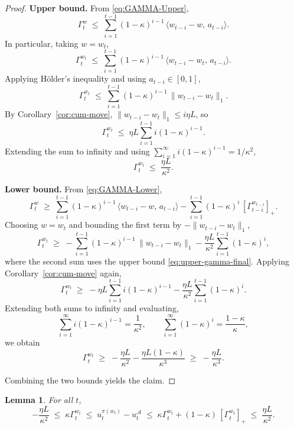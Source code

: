 \documentclass[11pt]{article}
\newtheorem{Thm:Lemma}{Lemma}
\begin{document}
\begin{proof}
\textbf{Upper bound.}  
From \eqref{eq:GAMMA-Upper},
\[
\Gamma_t^{w}
\;\leq\;
\sum_{i=1}^{t-1} (1-\kappa)^{i-1}\,\langle w_{t-i}-w,\,a_{t-i}\rangle .
\]
In particular, taking \(w=w_t\),
\[
\Gamma_t^{w_t}
\;\leq\;
\sum_{i=1}^{t-1} (1-\kappa)^{i-1}\,\langle w_{t-i}-w_t,\,a_{t-i}\rangle .
\]
Applying Hölder’s inequality and using \(a_{t-i}\in[0,1]\),
\[
\Gamma_t^{w_t}
\;\leq\;
\sum_{i=1}^{t-1} (1-\kappa)^{i-1}\,\|w_{t-i}-w_t\|_1 .
\]
By Corollary~\ref{cor:cum-move}, \(\|w_{t-i}-w_t\|_1 \le i\eta L\), so
\[
\Gamma_t^{w_t}
\;\leq\;
\eta L \sum_{i=1}^{t-1} i (1-\kappa)^{i-1}.
\]
Extending the sum to infinity and using \(\sum_{i=1}^\infty i (1-\kappa)^{i-1} = 1/\kappa^2\),
\begin{equation}
\label{eq:upper-gamma-final}
\Gamma_t^{w_t}
\;\leq\;
\frac{\eta L}{\kappa^2}.
\end{equation}

\medskip
\noindent
\textbf{Lower bound.}  
From \eqref{eq:GAMMA-Lower},
\[
\Gamma_t^w
\;\geq\;
\sum_{i=1}^{t-1} (1-\kappa)^{i-1}\,\langle w_{t-i}-w,\,a_{t-i}\rangle
-\sum_{i=1}^{t-1} (1-\kappa)^i\,[\Gamma_{t-i}^{w_{t-i}}]_+ .
\]
Choosing \(w=w_t\) and bounding the first term by \(-\|w_{t-i}-w_t\|_1\),
\[
\Gamma_t^{w_t}
\;\geq\;
-\sum_{i=1}^{t-1} (1-\kappa)^{i-1}\,\|w_{t-i}-w_t\|_1
-\frac{\eta L}{\kappa^2}\sum_{i=1}^{t-1} (1-\kappa)^i ,
\]
where the second sum uses the upper bound \eqref{eq:upper-gamma-final}.  
Applying Corollary~\ref{cor:cum-move} again,
\[
\Gamma_t^{w_t}
\;\geq\;
-\eta L \sum_{i=1}^{t-1} i (1-\kappa)^{i-1}
-\frac{\eta L}{\kappa^2}\sum_{i=1}^{t-1}(1-\kappa)^i .
\]
Extending both sums to infinity and evaluating,
\[
\sum_{i=1}^\infty i (1-\kappa)^{i-1} = \frac{1}{\kappa^2}, 
\qquad
\sum_{i=1}^\infty (1-\kappa)^i = \frac{1-\kappa}{\kappa},
\]
we obtain
\[
\Gamma_t^{w_t}
\;\geq\;
-\frac{\eta L}{\kappa^2} - \frac{\eta L(1-\kappa)}{\kappa^3}
\;\geq\;
-\frac{\eta L}{\kappa^3}.
\]

\medskip
\noindent
Combining the two bounds yields the claim.
\end{proof}






\begin{Thm:Lemma}
\label{lem:u-gap-by-b-gap-eff}
For all \(t\),
\[
-\frac{\eta L}{\kappa^2}
\;\leq\;
\kappa \Gamma_t^{w_t}
\;\leq\;
u_t^{\pi(w_t)} - u_t^\mathcal{A}
\;\leq\;
\kappa \Gamma_t^{w_t}
+(1-\kappa)\,[\Gamma_t^{w_t}]_+
\;\leq\;
\frac{\eta L}{\kappa^2}.
\]
\end{Thm:Lemma}
\end{document}
